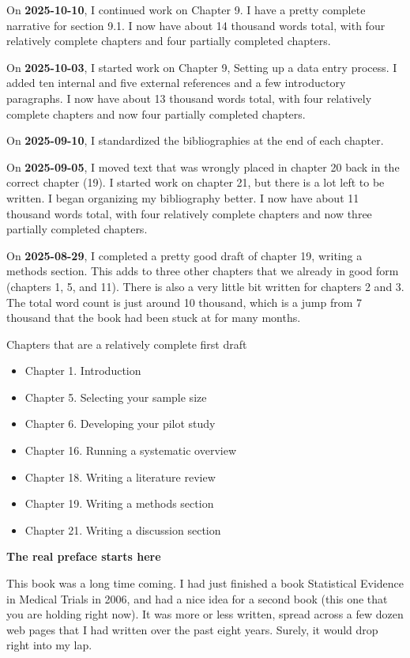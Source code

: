 \documentclass[
  letterpaper,
  DIV=11,
  numbers=noendperiod]{scrreprt}
\providecommand{\tightlist}{%
  \setlength{\itemsep}{0pt}\setlength{\parskip}{0pt}}
\begin{document}
On \textbf{2025-10-10}, I continued work on Chapter 9. I have a pretty
complete narrative for section 9.1. I now have about 14 thousand words
total, with four relatively complete chapters and four partially
completed chapters.

On \textbf{2025-10-03}, I started work on Chapter 9, Setting up a data
entry process. I added ten internal and five external references and a
few introductory paragraphs. I now have about 13 thousand words total,
with four relatively complete chapters and now four partially completed
chapters.

On \textbf{2025-09-10}, I standardized the bibliographies at the end of
each chapter.

On \textbf{2025-09-05}, I moved text that was wrongly placed in chapter
20 back in the correct chapter (19). I started work on chapter 21, but
there is a lot left to be written. I began organizing my bibliography
better. I now have about 11 thousand words total, with four relatively
complete chapters and now three partially completed chapters.

On \textbf{2025-08-29}, I completed a pretty good draft of chapter 19,
writing a methods section. This adds to three other chapters that we
already in good form (chapters 1, 5, and 11). There is also a very
little bit written for chapters 2 and 3. The total word count is just
around 10 thousand, which is a jump from 7 thousand that the book had
been stuck at for many months.

Chapters that are a relatively complete first draft

\begin{itemize}
\tightlist
\item
  Chapter 1. Introduction
\item
  Chapter 5. Selecting your sample size
\item
  Chapter 6. Developing your pilot study
\item
  Chapter 16. Running a systematic overview
\item
  Chapter 18. Writing a literature review
\item
  Chapter 19. Writing a methods section
\item
  Chapter 21. Writing a discussion section
\end{itemize}

\textbf{The real preface starts here}

This book was a long time coming. I had just finished a book Statistical
Evidence in Medical Trials in 2006, and had a nice idea for a second
book (this one that you are holding right now). It was more or less
written, spread across a few dozen web pages that I had written over the
past eight years. Surely, it would drop right into my lap.
\end{document}
